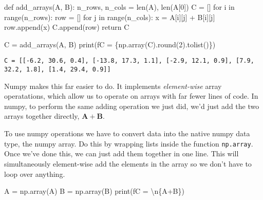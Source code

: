 \documentclass[
  letterpaper,
  DIV=11,
  numbers=noendperiod]{scrreprt}
\newenvironment{Shaded}{\begin{snugshade}}{\end{snugshade}}
\newcommand{\BuiltInTok}[1]{\textcolor[rgb]{0.00,0.23,0.31}{#1}}
\newcommand{\CharTok}[1]{\textcolor[rgb]{0.13,0.47,0.30}{#1}}
\newcommand{\ControlFlowTok}[1]{\textcolor[rgb]{0.00,0.23,0.31}{#1}}
\newcommand{\DecValTok}[1]{\textcolor[rgb]{0.68,0.00,0.00}{#1}}
\newcommand{\KeywordTok}[1]{\textcolor[rgb]{0.00,0.23,0.31}{#1}}
\newcommand{\NormalTok}[1]{\textcolor[rgb]{0.00,0.23,0.31}{#1}}
\newcommand{\OperatorTok}[1]{\textcolor[rgb]{0.37,0.37,0.37}{#1}}
\newcommand{\SpecialCharTok}[1]{\textcolor[rgb]{0.37,0.37,0.37}{#1}}
\newcommand{\SpecialStringTok}[1]{\textcolor[rgb]{0.13,0.47,0.30}{#1}}
\begin{document}
\begin{Shaded}
\begin{Highlighting}[]
\KeywordTok{def}\NormalTok{ add\_arrays(A, B):}
\NormalTok{    n\_rows, n\_cols }\OperatorTok{=} \BuiltInTok{len}\NormalTok{(A), }\BuiltInTok{len}\NormalTok{(A[}\DecValTok{0}\NormalTok{])}
\NormalTok{    C }\OperatorTok{=}\NormalTok{ []}
    \ControlFlowTok{for}\NormalTok{ i }\KeywordTok{in} \BuiltInTok{range}\NormalTok{(n\_rows):}
\NormalTok{        row }\OperatorTok{=}\NormalTok{ []}
        \ControlFlowTok{for}\NormalTok{ j }\KeywordTok{in} \BuiltInTok{range}\NormalTok{(n\_cols):}
\NormalTok{            x }\OperatorTok{=}\NormalTok{ A[i][j] }\OperatorTok{+}\NormalTok{ B[i][j]}
\NormalTok{            row.append(x)}
\NormalTok{        C.append(row)}
    \ControlFlowTok{return}\NormalTok{ C}

\NormalTok{C }\OperatorTok{=}\NormalTok{ add\_arrays(A, B)}
\BuiltInTok{print}\NormalTok{(}\SpecialStringTok{f\textquotesingle{}C = }\SpecialCharTok{\{}\NormalTok{np}\SpecialCharTok{.}\NormalTok{array(C)}\SpecialCharTok{.}\BuiltInTok{round}\NormalTok{(}\DecValTok{2}\NormalTok{)}\SpecialCharTok{.}\NormalTok{tolist()}\SpecialCharTok{\}}\SpecialStringTok{\textquotesingle{}}\NormalTok{)}
\end{Highlighting}
\end{Shaded}

\begin{verbatim}
C = [[-6.2, 30.6, 0.4], [-13.8, 17.3, 1.1], [-2.9, 12.1, 0.9], [7.9, 32.2, 1.8], [1.4, 29.4, 0.9]]
\end{verbatim}

Numpy makes this far easier to do. It implements \emph{element-wise}
array operatations, which allow us to operate on arrays with far fewer
lines of code. In numpy, to perform the same adding operation we just
did, we'd just add the two arrays together directly,
\(\mathbf{A}+\mathbf{B}\).

To use numpy operations we have to convert data into the native numpy
data type, the numpy array. Do this by wrapping lists inside the
function \texttt{np.array}. Once we've done this, we can just add them
together in one line. This will simultaneously element-wise add the
elements in the array so we don't have to loop over anything.

\begin{Shaded}
\begin{Highlighting}[]
\NormalTok{A }\OperatorTok{=}\NormalTok{ np.array(A)}
\NormalTok{B }\OperatorTok{=}\NormalTok{ np.array(B)}
\BuiltInTok{print}\NormalTok{(}\SpecialStringTok{f\textquotesingle{}C = }\CharTok{\textbackslash{}n}\SpecialCharTok{\{}\NormalTok{A}\OperatorTok{+}\NormalTok{B}\SpecialCharTok{\}}\SpecialStringTok{\textquotesingle{}}\NormalTok{)}
\end{Highlighting}
\end{Shaded}
\end{document}
